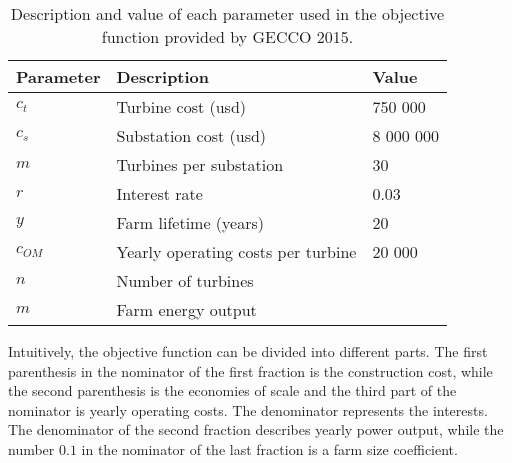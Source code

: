 \begin{table}[h!]
\begin{center}
\caption{Description and value of each parameter used in the objective function provided by GECCO 2015.}
\label{Parameters}
\begin{tabular}{l|l|l}
\textbf{Parameter} & \textbf{Description} & \textbf{Value} \\ 
\hline 
$c_t$ & Turbine cost (usd) & 750 000 \\ 
$c_s$ & Substation cost (usd) & 8 000 000 \\ 
$m$ & Turbines per substation & 30 \\ 
$r$ & Interest rate & 0.03 \\ 
$y$ & Farm lifetime (years) & 20 \\ 
$c_{OM}$ & Yearly operating costs per turbine & 20 000 \\ 
$n$ & Number of turbines &  \\ 
$m$ & Farm energy output &  \\  
\end{tabular} 
\end{center}
\end{table}


\noindent Intuitively, the objective function can be divided into different parts. The first parenthesis in the nominator of the first fraction is the construction cost, while the second parenthesis is the economies of scale and the third part of the nominator is yearly operating costs. The denominator represents the interests. The denominator of the second fraction describes yearly power output, while the number $0.1$ in the nominator of the last fraction is a farm size coefficient. \\


